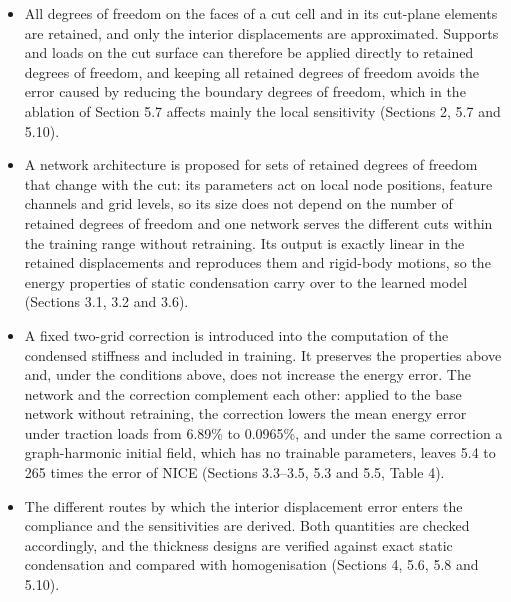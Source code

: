 \documentclass[preprint,12pt,authoryear]{elsarticle}
\providecommand{\tightlist}{\setlength{\itemsep}{0pt}\setlength{\parskip}{0pt}}
\begin{document}
\begin{itemize}
\tightlist
\item
  All degrees of freedom on the faces of a cut cell and in its cut-plane elements are retained, and only the interior displacements are approximated. Supports and loads on the cut surface can therefore be applied directly to retained degrees of freedom, and keeping all retained degrees of freedom avoids the error caused by reducing the boundary degrees of freedom, which in the ablation of Section 5.7 affects mainly the local sensitivity (Sections 2, 5.7 and 5.10).
\item
  A network architecture is proposed for sets of retained degrees of freedom that change with the cut: its parameters act on local node positions, feature channels and grid levels, so its size does not depend on the number of retained degrees of freedom and one network serves the different cuts within the training range without retraining. Its output is exactly linear in the retained displacements and reproduces them and rigid-body motions, so the energy properties of static condensation carry over to the learned model (Sections 3.1, 3.2 and 3.6).
\item
  A fixed two-grid correction is introduced into the computation of the condensed stiffness and included in training. It preserves the properties above and, under the conditions above, does not increase the energy error. The network and the correction complement each other: applied to the base network without retraining, the correction lowers the mean energy error under traction loads from 6.89\% to 0.0965\%, and under the same correction a graph-harmonic initial field, which has no trainable parameters, leaves 5.4 to 265 times the error of NICE (Sections 3.3--3.5, 5.3 and 5.5, Table 4).
\item
  The different routes by which the interior displacement error enters the compliance and the sensitivities are derived. Both quantities are checked accordingly, and the thickness designs are verified against exact static condensation and compared with homogenisation (Sections 4, 5.6, 5.8 and 5.10).
\end{itemize}
\end{document}
